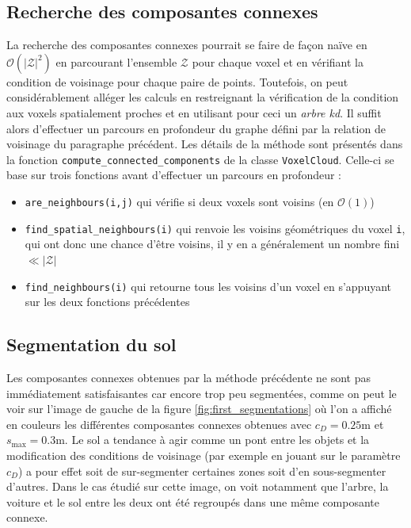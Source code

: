 \documentclass[a4paper, onecolumn, 11pt]{article}
\begin{document}
\subsection{Recherche des composantes connexes}
La recherche des composantes connexes pourrait se faire de façon naïve en $\mathcal{O}(|\mathcal{Z}|^2)$ en parcourant l'ensemble $\mathcal{Z}$ pour chaque voxel et en vérifiant la condition de voisinage pour chaque paire de points. Toutefois, on peut considérablement alléger les calculs en restreignant la vérification de la condition aux voxels spatialement proches et en utilisant pour ceci un \emph{arbre kd}. Il suffit alors d'effectuer un parcours en profondeur du graphe défini par la relation de voisinage du paragraphe précédent. Les détails de la méthode sont présentés dans la fonction \texttt{compute\_connected\_components} de la classe \texttt{VoxelCloud}. Celle-ci se base sur trois fonctions avant d'effectuer un parcours en profondeur :
\begin{itemize}
    \item \texttt{are\_neighbours(i,j)} qui vérifie si deux voxels sont voisins (en $\mathcal{O}(1)$)
    \item \texttt{find\_spatial\_neighbours(i)} qui renvoie les voisins géométriques du voxel \texttt{i}, qui ont donc une chance d'être voisins, il y en a généralement un nombre fini $\ll |\mathcal{Z}|$
    \item \texttt{find\_neighbours(i)} qui retourne tous les voisins d'un voxel en s'appuyant sur les deux fonctions précédentes
\end{itemize}

\subsection{Segmentation du sol}
\label{segmentation-sol}
Les composantes connexes obtenues par la méthode précédente ne sont pas immédiatement satisfaisantes car encore trop peu segmentées, comme on peut le voir sur l'image de gauche de la figure \ref{fig:first_segmentations} où l'on a affiché en couleurs les différentes composantes connexes obtenues avec $c_D = 0.25\text{m}$ et $s_\text{max}=0.3\text{m}$. Le sol a tendance à agir comme un pont entre les objets et la modification des conditions de voisinage (par exemple en jouant sur le paramètre $c_D$) a pour effet soit de sur-segmenter certaines zones soit d'en sous-segmenter d'autres. Dans le cas étudié sur cette image, on voit notamment que l'arbre, la voiture et le sol entre les deux ont été regroupés dans une même composante connexe. 
\end{document}
